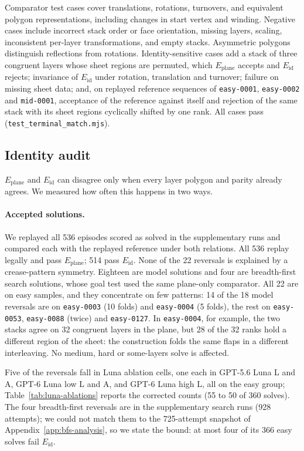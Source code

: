 Comparator test cases cover translations, rotations, turnovers, and equivalent polygon
representations, including changes in start vertex and winding. Negative cases include
incorrect stack order or face orientation, missing layers, scaling, inconsistent
per-layer transformations, and empty stacks. Asymmetric polygons distinguish
reflections from rotations. Identity-sensitive cases add a stack of three congruent layers whose
sheet regions are permuted, which $E_{\mathrm{plane}}$ accepts and $E_{\mathrm{id}}$ rejects;
invariance of $E_{\mathrm{id}}$ under rotation, translation and turnover; failure on missing
sheet data; and, on replayed reference sequences of \texttt{easy-0001}, \texttt{easy-0002} and
\texttt{mid-0001}, acceptance of the reference against itself and rejection of the same stack
with its sheet regions cyclically shifted by one rank. All cases pass
(\texttt{test\_terminal\_match.mjs}).

\subsection{Identity audit}
\label{app:identity-audit}

$E_{\mathrm{plane}}$ and $E_{\mathrm{id}}$ can disagree only when every layer polygon and parity
already agrees. We measured how often this happens in two ways.

\paragraph{Accepted solutions.} We replayed all 536 episodes scored as solved in the
supplementary runs and compared each with the replayed reference under both relations. All 536
replay legally and pass $E_{\mathrm{plane}}$; 514 pass $E_{\mathrm{id}}$. None of the 22 reversals is
explained by a crease-pattern symmetry. Eighteen are model solutions and four are breadth-first
search solutions, whose goal test used the same plane-only comparator. All 22 are on easy
samples, and they concentrate on few patterns: 14 of the 18 model reversals are on
\texttt{easy-0003} (10 folds) and \texttt{easy-0004} (5 folds), the rest on \texttt{easy-0053},
\texttt{easy-0088} (twice) and \texttt{easy-0127}. In \texttt{easy-0004}, for example, the two
stacks agree on 32 congruent layers in the plane, but 28 of the 32 ranks hold a different region
of the sheet: the construction folds the same flaps in a different interleaving. No medium, hard or
some-layers solve is affected.

Five of the reversals fall in Luna ablation cells, one each in GPT-5.6 Luna L and A, GPT-6 Luna low
L and A, and GPT-6 Luna high L, all on the easy group; Table~\ref{tab:luna-ablations} reports
the corrected counts (55 to 50 of 360 solves). The four breadth-first reversals are in the
supplementary search runs (928 attempts); we could not match them to the 725-attempt snapshot of
Appendix~\ref{app:bfs-analysis}, so we state the bound: at most four of its 366 easy solves fail
$E_{\mathrm{id}}$.

